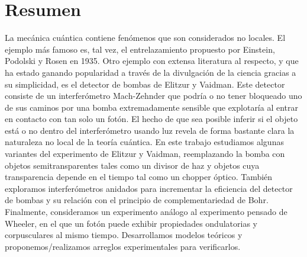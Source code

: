 \documentclass[12pt]{book}
\newcommand\blankpage{
    \null
    \thispagestyle{empty}
    \addtocounter{page}{0}
    \newpage
    }
\begin{document}
\pagebreak



\blankpage{}
\chapter*{Resumen}

La mecánica cuántica contiene fenómenos que son considerados no locales. El ejemplo más famoso es, tal vez, el entrelazamiento propuesto por Einstein, Podolski y Rosen en 1935. Otro ejemplo con extensa literatura al respecto, y que ha estado ganando popularidad a través de la divulgación de la ciencia gracias a su simplicidad, es el detector de bombas de Elitzur y Vaidman. Este detector consiste de un interferómetro  Mach-Zehnder que podría o no tener bloqueado uno de sus caminos por una bomba extremadamente sensible que explotaría al entrar en contacto con tan solo un fotón. El hecho de que sea posible inferir si el objeto está o no dentro del interferómetro usando luz revela de forma bastante clara la naturaleza no local de la teoría cuántica. En este trabajo estudiamos algunas variantes del experimento de Elitzur y Vaidman, reemplazando la bomba con objetos semitransparentes tales como un divisor de haz y objetos cuya transparencia depende en el tiempo tal como un chopper óptico. También exploramos interferómetros anidados para incrementar la eficiencia del detector de bombas y su relación con el principio de complementariedad de Bohr. Finalmente, consideramos un experimento análogo al experimento pensado de Wheeler, en el que un fotón puede exhibir propiedades ondulatorias y corpusculares al mismo tiempo. Desarrollamos modelos teóricos y proponemos/realizamos arreglos experimentales para verificarlos.
\thispagestyle{plain}

\pagebreak



\blankpage{}
\end{document}
